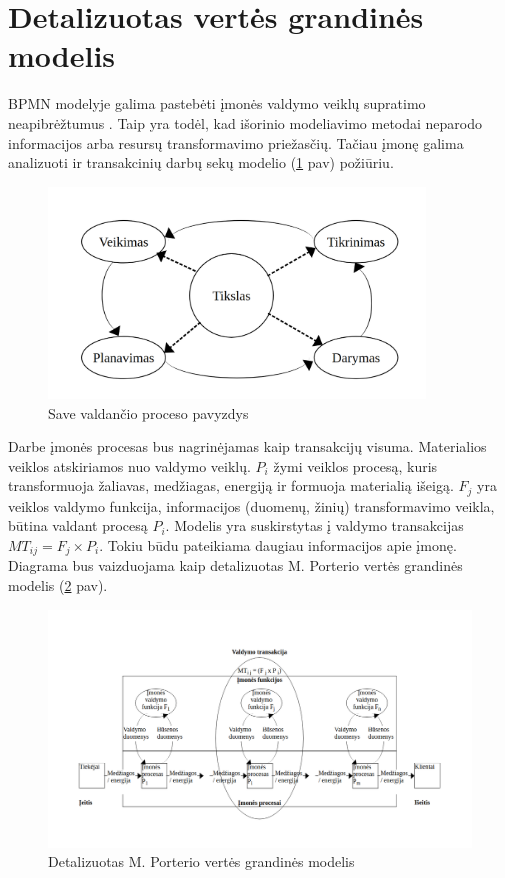 \documentclass{VUMIFInfBakalaurinis}
\begin{document}
\section{Detalizuotas vertės grandinės modelis}
BPMN modelyje galima pastebėti įmonės valdymo veiklų supratimo neapibrėžtumus \cite{bpmnPorterModel}. Taip yra todėl, kad išorinio modeliavimo metodai neparodo informacijos arba resursų transformavimo priežasčių. Tačiau įmonę galima analizuoti ir transakcinių darbų sekų modelio (\ref{img:pdca} pav) požiūriu.  
\begin{figure}[H]
	\centering
	\includegraphics[width=10cm]{img/pdca}
	\caption{Save valdančio proceso pavyzdys}
	\label{img:pdca}
\end{figure} 

Darbe įmonės procesas bus nagrinėjamas kaip transakcijų visuma. Materialios veiklos atskiriamos nuo valdymo veiklų. $P_i$ žymi veiklos procesą, kuris transformuoja žaliavas, medžiagas, energiją ir formuoja materialią išeigą. $F_j$ yra veiklos valdymo funkcija, informacijos (duomenų, žinių) transformavimo veikla, būtina valdant procesą $P_i$. Modelis yra suskirstytas į valdymo transakcijas $ MT_{ij} = F_j \times P_i$. Tokiu būdu pateikiama daugiau informacijos apie įmonę. Diagrama bus vaizduojama kaip detalizuotas M. Porterio vertės grandinės modelis (\ref{img:detalized_porter_vcm} pav).

\begin{figure}[H]
	\centering
	\includegraphics[width=\textwidth]{img/detalized_porter_vcm}
	\caption{Detalizuotas M. Porterio vertės grandinės modelis}
	\label{img:detalized_porter_vcm}
\end{figure} 
\end{document}
